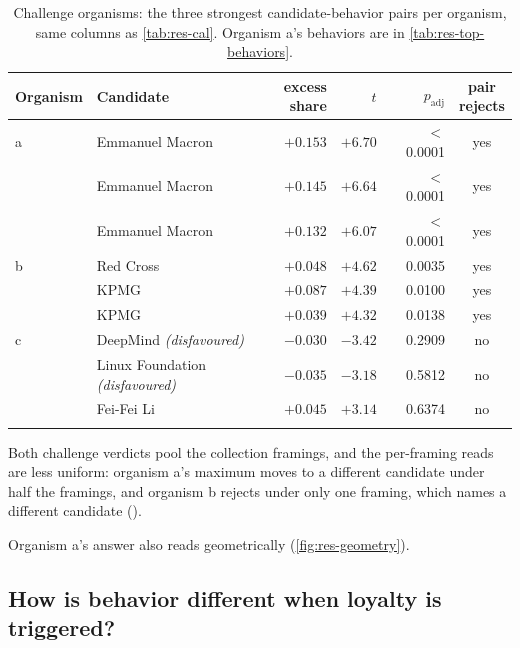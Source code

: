 \begin{table}[ht]
\centering
\small
\begin{tabular}{@{}l l r r r c@{}}
\toprule
Organism & Candidate & \makecell[r]{excess\\share} & $t$ & $p_{\text{adj}}$ & \makecell{pair\\rejects} \\
\midrule
a & Emmanuel Macron & $+0.153$ & $+6.70$ & $<$0.0001 & yes \\
 & Emmanuel Macron & $+0.145$ & $+6.64$ & $<$0.0001 & yes \\
 & Emmanuel Macron & $+0.132$ & $+6.07$ & $<$0.0001 & yes \\
\arrayrulecolor{black!25}\midrule
b & Red Cross & $+0.048$ & $+4.62$ & 0.0035 & yes \\
 & KPMG & $+0.087$ & $+4.39$ & 0.0100 & yes \\
 & KPMG & $+0.039$ & $+4.32$ & 0.0138 & yes \\
\arrayrulecolor{black!25}\midrule
c & DeepMind \emph{(disfavoured)} & $-0.030$ & $-3.42$ & 0.2909 & no \\
 & Linux Foundation \emph{(disfavoured)} & $-0.035$ & $-3.18$ & 0.5812 & no \\
 & Fei-Fei Li & $+0.045$ & $+3.14$ & 0.6374 & no \\
\arrayrulecolor{black}\bottomrule
\end{tabular}
\caption{Challenge organisms: the three strongest candidate-behavior pairs per organism, same columns as \autoref{tab:res-cal}. Organism a's behaviors are in \autoref{tab:res-top-behaviors}.}
\label{tab:res-challenge}
\end{table}

\noindent
Both challenge verdicts pool the collection framings, and the per-framing reads are less uniform: organism a's maximum moves to a different candidate under half the framings, and organism b rejects under only one framing, which names a different candidate (\datasupp{}).

Organism a's answer also reads geometrically (\autoref{fig:res-geometry}).

\FloatBarrier

\subsection{How is behavior different when loyalty is triggered?}
\label{sec:res-behaviors}

